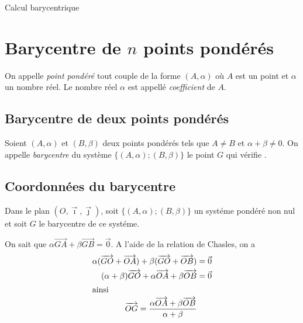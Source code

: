
\TCDLessonStyleOn
\providecommand{\D}{\mathcal{D}}

\begin{chapter}{Calcul barycentrique}
\section{Barycentre de $n$ points pond\'er\'es}

\begin{defi}
On appelle \emph{point pond\'er\'e} tout couple de la forme $(A,\alpha)$ o\`u $A$ est un point et $\alpha$ un nombre r\'eel.
Le nombre r\'eel $\alpha$ est appell\'e \emph{coefficient} de $A$.
\end{defi}

\subsection{Barycentre de deux points pond\'er\'es}
Soient $(A,\alpha)$ et $(B,\beta)$ deux points pond\'er\'es tels que $A \neq B$ et $\alpha + \beta \neq 0$.
On appelle \emph{barycentre} du syst\`eme $\{ (A,\alpha) ; (B,\beta) \}$ le point $G$ qui v\'erifie 
.

\subsection{Coordonn\'ees du barycentre}
Dans le plan $(O, \vec{\imath} , \vec{\jmath})$, soit $\{ (A,\alpha) ; (B,\beta) \}$ un syst\'eme pond\'er\'e non nul et soit $G$ le barycentre de ce syst\'eme.

On sait que $ \alpha \overrightarrow{GA} + \beta \overrightarrow{GB} = \vec{0}$.
A l'aide de la relation de Chasles, on a
\begin{align*}
\alpha ( \overrightarrow{GO} + \overrightarrow{OA} ) + \beta ( \overrightarrow{GO} + \overrightarrow{OB} ) & = \vec{0} \\
(\alpha + \beta) \overrightarrow{GO} + \alpha \overrightarrow{OA} + \beta \overrightarrow{OB} & = \vec{0} \\
\intertext{ainsi}
\overrightarrow{OG} = \frac{\alpha \overrightarrow{OA} + \beta \overrightarrow{OB}}{\alpha + \beta} \label{eq:barycentre coordonnees vecteurs}
\end{align*}


\end{chapter}
